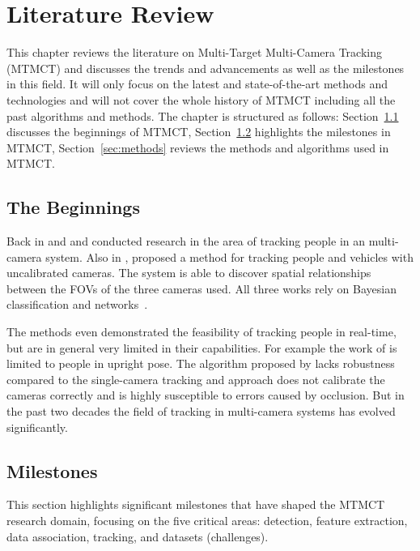 \chapter{Literature Review}\label{chap:literature_review}
This chapter reviews the literature on Multi-Target Multi-Camera Tracking (MTMCT) and discusses the trends and advancements as well as the milestones in this field. It will only focus on the latest and state-of-the-art methods and technologies and will not cover the whole history of MTMCT including all the past algorithms and methods. The chapter is structured as follows: Section~\ref{sec:the_beginnings} discusses the beginnings of MTMCT, Section~\ref{sec:milestones} highlights the milestones in MTMCT, Section~\ref{sec:methods} reviews the methods and algorithms used in MTMCT.

\section{The Beginnings}\label{sec:the_beginnings}
Back in \citeyear{Cai99} and \citeyear{Chang01} \textcite{Cai99} and \textcite{Chang01} conducted research in the area of tracking people in an multi-camera system. Also in \citeyear{Khan01}, \textcite{Khan01} proposed a method for tracking people and vehicles with uncalibrated cameras. The system is able to discover spatial relationships between the FOVs of the three cameras used. All three works rely on Bayesian classification and networks~\cite{Pearl88}.

The methods even demonstrated the feasibility of tracking people in real-time, but are in general very limited in their capabilities. For example the work of \citeauthor{Chang01} is limited to people in upright pose. The algorithm proposed by \citeauthor{Cai99} lacks robustness compared to the single-camera tracking and \citeauthor{Khan01} approach does not calibrate the cameras correctly and is highly susceptible to errors caused by occlusion. But in the past two decades the field of tracking in multi-camera systems has evolved significantly.

\section{Milestones}\label{sec:milestones}
This section highlights significant milestones that have shaped the MTMCT research domain, focusing on the five critical areas: detection, feature extraction, data association, tracking, and datasets (challenges).

